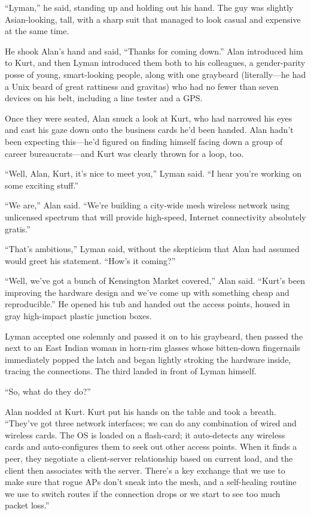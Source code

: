 \documentclass{article}
\begin{document}
``Lyman,'' he said, standing up and holding out his hand.  The guy was
slightly Asian-looking, tall, with a sharp suit that managed to look
casual and expensive at the same time.

He shook Alan's hand and said, ``Thanks for coming down.'' Alan
introduced him to Kurt, and then Lyman introduced them both to his
colleagues, a gender-parity posse of young, smart-looking people,
along with one graybeard (literally---he had a Unix beard of great
rattiness and gravitas) who had no fewer than seven devices on his
belt, including a line tester and a GPS.

Once they were seated, Alan snuck a look at Kurt, who had narrowed his
eyes and cast his gaze down onto the business cards he'd been handed. 
Alan hadn't been expecting this---he'd figured on finding himself
facing down a group of career bureaucrats---and Kurt was clearly
thrown for a loop, too.

``Well, Alan, Kurt, it's nice to meet you,'' Lyman said.  ``I hear
you're working on some exciting stuff.''

``We are,'' Alan said.  ``We're building a city-wide mesh wireless
network using unlicensed spectrum that will provide high-speed,
Internet connectivity absolutely gratis.''

``That's ambitious,'' Lyman said, without the skepticism that Alan had
assumed would greet his statement.  ``How's it coming?''

``Well, we've got a bunch of Kensington Market covered,'' Alan said. 
``Kurt's been improving the hardware design and we've come up with
something cheap and reproducible.'' He opened his tub and handed out
the access points, housed in gray high-impact plastic junction boxes.

Lyman accepted one solemnly and passed it on to his graybeard, then
passed the next to an East Indian woman in horn-rim glasses whose
bitten-down fingernails immediately popped the latch and began lightly
stroking the hardware inside, tracing the connections.  The third
landed in front of Lyman himself.

``So, what do they do?''

Alan nodded at Kurt.  Kurt put his hands on the table and took a
breath.  ``They've got three network interfaces; we can do any
combination of wired and wireless cards.  The OS is loaded on a
flash-card; it auto-detects any wireless cards and auto-configures
them to seek out other access points.  When it finds a peer, they
negotiate a client-server relationship based on current load, and the
client then associates with the server.  There's a key exchange that
we use to make sure that rogue APs don't sneak into the mesh, and a
self-healing routine we use to switch routes if the connection drops
or we start to see too much packet loss.''
\end{document}
